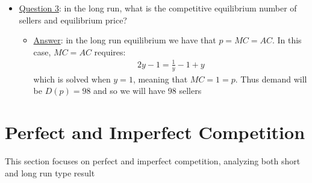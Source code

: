\documentclass{article}
\begin{document}
  \begin{itemize}
    \item  \underline{Question 3}: in the long run, what is the competitive equilibrium number of sellers and equilibrium price?
    \begin{itemize}
      \item  \underline{Answer}: in the long run equilibrium  we have that $p = MC = AC$. In this case, $MC = AC$ requires:
      \begin{gather*}
        2y - 1 = \frac{1}{y} - 1 + y
      \end{gather*}
      which is solved when $y=1$, meaning that $MC = 1 = p$. Thus demand will be $D(p) = 98$ and so we will have 98 sellers
    \end{itemize}
  \end{itemize}
\par

\newpage

\vspace{2.5mm}
\section{Perfect and Imperfect Competition}
This section focuses on perfect and imperfect competition, analyzing both short and long run type result
\vspace{6mm}
\end{document}
